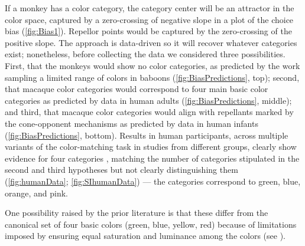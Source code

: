 If a monkey has a color category, the category center will be an attractor in the color space, captured by a zero-crossing of negative slope in a plot of the choice bias (\autoref{fig:Bias1}). 
Repellor points would be captured by the zero-crossing of the positive slope.
The approach is data-driven so it will recover whatever categories exist; nonetheless, before collecting the data we considered three possibilities. 
First, that the monkeys would show no color categories, as predicted by the work sampling a limited range of colors in baboons \citep{davidoff_cross-species_2010}
(\autoref{fig:BiasPredictions}, top);
second, that macaque color categories would correspond to  four main basic color categories as predicted by data in human adults (\autoref{fig:BiasPredictions}, middle); 
and third, that macaque color categories would align with repellants marked by the cone-opponent mechanisms as predicted by data in human infants \citep{skelton_biological_2017} (\autoref{fig:BiasPredictions}, bottom). 
Results in human participants, across multiple variants of the color-matching task in studies from different groups, clearly show evidence for four categories \citep{bae_why_2015,panichello_error-correcting_2019}, matching the number of categories stipulated in the second and third hypotheses but not clearly distinguishing them (\autoref{fig:humanData}; \autoref{fig:SIhumanData}) — the categories correspond to green, blue, orange, and pink. 

One possibility raised by the prior literature is that these differ from the canonical set of four basic colors (green, blue, yellow, red) because of limitations imposed by ensuring equal saturation and luminance among the colors (see \citep{bae_why_2015}). 
